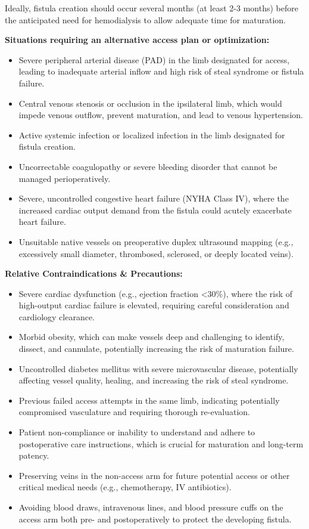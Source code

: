 Ideally, fistula creation should occur several months (at least 2-3 months) before the anticipated need for hemodialysis to allow adequate time for maturation.

\textbf{Situations requiring an alternative access plan or optimization:}
\begin{itemize}
  \item Severe peripheral arterial disease (PAD) in the limb designated for access, leading to inadequate arterial inflow and high risk of steal syndrome or fistula failure.
  \item Central venous stenosis or occlusion in the ipsilateral limb, which would impede venous outflow, prevent maturation, and lead to venous hypertension.
  \item Active systemic infection or localized infection in the limb designated for fistula creation.
  \item Uncorrectable coagulopathy or severe bleeding disorder that cannot be managed perioperatively.
  \item Severe, uncontrolled congestive heart failure (NYHA Class IV), where the increased cardiac output demand from the fistula could acutely exacerbate heart failure.
  \item Unsuitable native vessels on preoperative duplex ultrasound mapping (e.g., excessively small diameter, thrombosed, sclerosed, or deeply located veins).
\end{itemize}

\textbf{Relative Contraindications \& Precautions:}
\begin{itemize}
  \item Severe cardiac dysfunction (e.g., ejection fraction <30\%), where the risk of high-output cardiac failure is elevated, requiring careful consideration and cardiology clearance.
  \item Morbid obesity, which can make vessels deep and challenging to identify, dissect, and cannulate, potentially increasing the risk of maturation failure.
  \item Uncontrolled diabetes mellitus with severe microvascular disease, potentially affecting vessel quality, healing, and increasing the risk of steal syndrome.
  \item Previous failed access attempts in the same limb, indicating potentially compromised vasculature and requiring thorough re-evaluation.
  \item Patient non-compliance or inability to understand and adhere to postoperative care instructions, which is crucial for maturation and long-term patency.
  \item Preserving veins in the non-access arm for future potential access or other critical medical needs (e.g., chemotherapy, IV antibiotics).
  \item Avoiding blood draws, intravenous lines, and blood pressure cuffs on the access arm both pre- and postoperatively to protect the developing fistula.
\end{itemize}

